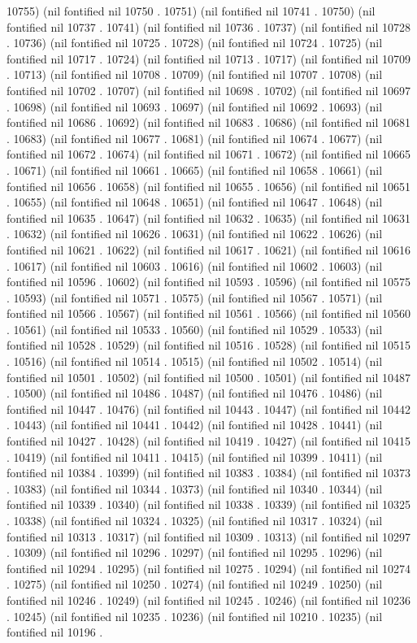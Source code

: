 10755) (nil fontified nil 10750 . 10751) (nil fontified nil 10741 . 10750) (nil fontified nil 10737 . 10741) (nil fontified nil 10736 . 10737) (nil fontified nil 10728 . 10736) (nil fontified nil 10725 . 10728) (nil fontified nil 10724 . 10725) (nil fontified nil 10717 . 10724) (nil fontified nil 10713 . 10717) (nil fontified nil 10709 . 10713) (nil fontified nil 10708 . 10709) (nil fontified nil 10707 . 10708) (nil fontified nil 10702 . 10707) (nil fontified nil 10698 . 10702) (nil fontified nil 10697 . 10698) (nil fontified nil 10693 . 10697) (nil fontified nil 10692 . 10693) (nil fontified nil 10686 . 10692) (nil fontified nil 10683 . 10686) (nil fontified nil 10681 . 10683) (nil fontified nil 10677 . 10681) (nil fontified nil 10674 . 10677) (nil fontified nil 10672 . 10674) (nil fontified nil 10671 . 10672) (nil fontified nil 10665 . 10671) (nil fontified nil 10661 . 10665) (nil fontified nil 10658 . 10661) (nil fontified nil 10656 . 10658) (nil fontified nil 10655 . 10656) (nil fontified nil 10651 . 10655) (nil fontified nil 10648 . 10651) (nil fontified nil 10647 . 10648) (nil fontified nil 10635 . 10647) (nil fontified nil 10632 . 10635) (nil fontified nil 10631 . 10632) (nil fontified nil 10626 . 10631) (nil fontified nil 10622 . 10626) (nil fontified nil 10621 . 10622) (nil fontified nil 10617 . 10621) (nil fontified nil 10616 . 10617) (nil fontified nil 10603 . 10616) (nil fontified nil 10602 . 10603) (nil fontified nil 10596 . 10602) (nil fontified nil 10593 . 10596) (nil fontified nil 10575 . 10593) (nil fontified nil 10571 . 10575) (nil fontified nil 10567 . 10571) (nil fontified nil 10566 . 10567) (nil fontified nil 10561 . 10566) (nil fontified nil 10560 . 10561) (nil fontified nil 10533 . 10560) (nil fontified nil 10529 . 10533) (nil fontified nil 10528 . 10529) (nil fontified nil 10516 . 10528) (nil fontified nil 10515 . 10516) (nil fontified nil 10514 . 10515) (nil fontified nil 10502 . 10514) (nil fontified nil 10501 . 10502) (nil fontified nil 10500 . 10501) (nil fontified nil 10487 . 10500) (nil fontified nil 10486 . 10487) (nil fontified nil 10476 . 10486) (nil fontified nil 10447 . 10476) (nil fontified nil 10443 . 10447) (nil fontified nil 10442 . 10443) (nil fontified nil 10441 . 10442) (nil fontified nil 10428 . 10441) (nil fontified nil 10427 . 10428) (nil fontified nil 10419 . 10427) (nil fontified nil 10415 . 10419) (nil fontified nil 10411 . 10415) (nil fontified nil 10399 . 10411) (nil fontified nil 10384 . 10399) (nil fontified nil 10383 . 10384) (nil fontified nil 10373 . 10383) (nil fontified nil 10344 . 10373) (nil fontified nil 10340 . 10344) (nil fontified nil 10339 . 10340) (nil fontified nil 10338 . 10339) (nil fontified nil 10325 . 10338) (nil fontified nil 10324 . 10325) (nil fontified nil 10317 . 10324) (nil fontified nil 10313 . 10317) (nil fontified nil 10309 . 10313) (nil fontified nil 10297 . 10309) (nil fontified nil 10296 . 10297) (nil fontified nil 10295 . 10296) (nil fontified nil 10294 . 10295) (nil fontified nil 10275 . 10294) (nil fontified nil 10274 . 10275) (nil fontified nil 10250 . 10274) (nil fontified nil 10249 . 10250) (nil fontified nil 10246 . 10249) (nil fontified nil 10245 . 10246) (nil fontified nil 10236 . 10245) (nil fontified nil 10235 . 10236) (nil fontified nil 10210 . 10235) (nil fontified nil 10196 . 